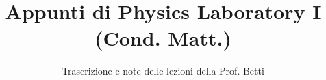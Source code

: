\documentclass[a4paper,12pt]{article}
\title{Appunti di Physics Laboratory I (Cond. Matt.)}
\author{Trascrizione e note delle lezioni della Prof. Betti}
\date{}
\begin{document}
\maketitle
\projectintro
\tableofcontents
\newpage

\end{document}
